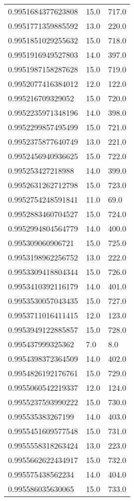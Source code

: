 \begin{center}
\begin{supertabular}[H]{p{0.30\textwidth}p{0.05\textwidth}p{0.05\textwidth}}
0.9951684377623808 & 15.0 & 717.0 \\ 
0.9951771359885592 & 13.0 & 220.0 \\ 
0.9951851029255632 & 15.0 & 718.0 \\ 
0.9951916949527803 & 14.0 & 397.0 \\ 
0.9951987158287628 & 15.0 & 719.0 \\ 
0.9952077416384012 & 12.0 & 122.0 \\ 
0.995216709329052 & 15.0 & 720.0 \\ 
0.9952235971348196 & 14.0 & 398.0 \\ 
0.9952299857495499 & 15.0 & 721.0 \\ 
0.9952375877640749 & 13.0 & 221.0 \\ 
0.9952456940936625 & 15.0 & 722.0 \\ 
0.995253427218988 & 14.0 & 399.0 \\ 
0.9952631262712798 & 15.0 & 723.0 \\ 
0.9952754248591841 & 11.0 & 69.0 \\ 
0.9952883460704527 & 15.0 & 724.0 \\ 
0.9952994804564779 & 14.0 & 400.0 \\ 
0.995309060906721 & 15.0 & 725.0 \\ 
0.9953198962256752 & 13.0 & 222.0 \\ 
0.9953309418804344 & 15.0 & 726.0 \\ 
0.9953410392116179 & 14.0 & 401.0 \\ 
0.9953530057043435 & 15.0 & 727.0 \\ 
0.9953711016411415 & 12.0 & 123.0 \\ 
0.9953949122885857 & 15.0 & 728.0 \\ 
0.995437999325362 & 7.0 & 8.0 \\ 
0.9954398372364509 & 14.0 & 402.0 \\ 
0.9954826192176761 & 15.0 & 729.0 \\ 
0.9955060542219337 & 12.0 & 124.0 \\ 
0.9955237593990222 & 15.0 & 730.0 \\ 
0.995535383267199 & 14.0 & 403.0 \\ 
0.9955451609577548 & 15.0 & 731.0 \\ 
0.9955558318263424 & 13.0 & 223.0 \\ 
0.9955662622434917 & 15.0 & 732.0 \\ 
0.995575438562234 & 14.0 & 404.0 \\ 
0.995586035630065 & 15.0 & 733.0 \\ 

\end{supertabular}
\end{center}
